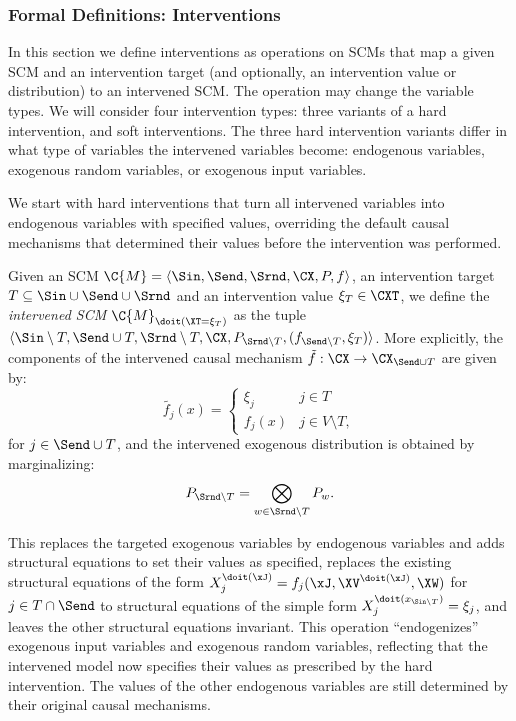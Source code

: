\subsubsection{Formal Definitions: Interventions}

In this section we define interventions as operations on SCMs that map a given
SCM and an intervention target (and optionally, an intervention value or
distribution) to an intervened SCM. The operation may change the variable
types. We will consider four intervention types: three variants of a hard
intervention, and soft interventions. The three hard intervention variants
differ in what type of variables the intervened variables become: endogenous
variables, exogenous random variables, or exogenous input variables.

We start with hard interventions that turn all intervened variables into
endogenous variables with specified values, overriding
the default causal mechanisms that determined their values before the
intervention was performed.
\begin{Def}\label{def:scm_hard_intervention}
  Given an SCM $\C{M} = \langle \Sin, \Send, \Srnd, \CX, P, f \rangle$, an intervention target $T \subseteq \Sin \cup \Send \cup \Srnd$ 
  and an intervention value $\xi_T \in \CXT$, we define the \emph{intervened SCM
  $\C{M}_{\doit(\XT=\xi_T)}$} as the tuple $\langle \Sin\setminus T,\Send \cup T,\Srnd \setminus T,\CX,P_{\Srnd\setminus T},(f_{\Send\setminus T},\xi_T) \rangle$.
  More explicitly, the components of the intervened causal mechanism $\tilde{f} : \CX \to \CX_{\Send \cup T}$ are
  given by:
    $$\tilde{f_j}(x) = \begin{cases}
      \xi_j & j \in T \\
        f_j(x) & j \in V \setminus T,
    \end{cases}$$
  for $j \in \Send \cup T$, and the intervened exogenous distribution is obtained by marginalizing:
  $$P_{\Srnd\setminus T} = \bigotimes_{w\in\Srnd\setminus T} P_w.$$
\end{Def}
This replaces the targeted exogenous variables by endogenous variables and adds structural equations
to set their values as specified, replaces the existing structural equations of the form
$X_j^{\doit(\xJ)} = f_j(\xJ,\XV^{\doit(\xJ)},\XW)$ for $j \in T \cap \Send$ to structural equations of the simple form 
$X_j^{\doit(x_{\Sin\setminus T})} = \xi_j$, and leaves the other structural equations invariant.
This operation ``endogenizes'' exogenous input variables and exogenous random variables,
reflecting that the intervened model now specifies their values as prescribed by the hard intervention.
The values of the other endogenous variables are still determined by their original causal mechanisms.

